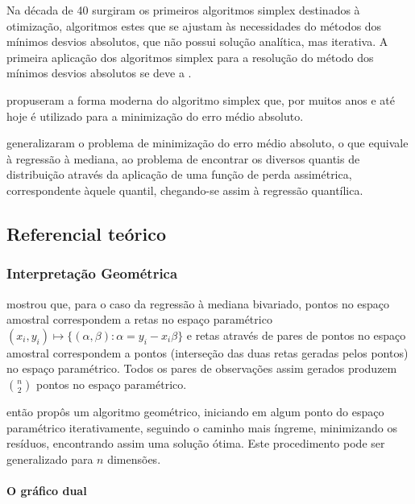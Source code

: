 \documentclass[a4paper, 12pt]{article}
\let\oldparagraph\paragraph
\renewcommand{\paragraph}[1]{\oldparagraph{#1}\mbox{}}
\begin{document}
Na década de 40 surgiram os primeiros algoritmos simplex destinados à
otimização, algoritmos estes que se ajustam às necessidades do métodos
dos mínimos desvios absolutos, que não possui solução analítica, mas
iterativa. A primeira aplicação dos algoritmos simplex para a resolução
do método dos mínimos desvios absolutos se deve a \textcite{charnes}
\autocites[ver][281]{tortoise}[4]{conopt}.

\textcite{barrodale} propuseram a forma moderna do algoritmo simplex
que, por muitos anos e até hoje é utilizado para a minimização do erro
médio absoluto.

\textcite{koenker1978} generalizaram o problema de minimização do erro
médio absoluto, o que equivale à regressão à mediana, ao problema de
encontrar os diversos quantis de distribuição através da aplicação de
uma função de perda assimétrica, correspondente àquele quantil,
chegando-se assim à regressão quantílica.

\hypertarget{referencial-teorico}{%
\subsection{Referencial teórico}\label{referencial-teorico}}

\hypertarget{interpretacao-geometrica}{%
\subsubsection{Interpretação
Geométrica}\label{interpretacao-geometrica}}

\textcite{edgeworth1888} mostrou que, para o caso da regressão à mediana
bivariado, pontos no espaço amostral correspondem a retas no espaço
paramétrico
\((x_i, y_i) \mapsto \{(\alpha, \beta): \alpha = y_i - x_i \beta\}\) e
retas através de pares de pontos no espaço amostral correspondem a
pontos (interseção das duas retas geradas pelos pontos) no espaço
paramétrico. Todos os pares de observações assim gerados produzem
\(\binom{n}{2}\) pontos no espaço paramétrico.

\textcite{edgeworth1888} então propôs um algoritmo geométrico, iniciando
em algum ponto do espaço paramétrico iterativamente, seguindo o caminho
mais íngreme, minimizando os resíduos, encontrando assim uma solução
ótima. Este procedimento pode ser generalizado para \(n\) dimensões.

\hypertarget{o-grafico-dual}{%
\paragraph{O gráfico dual}\label{o-grafico-dual}}
\end{document}
